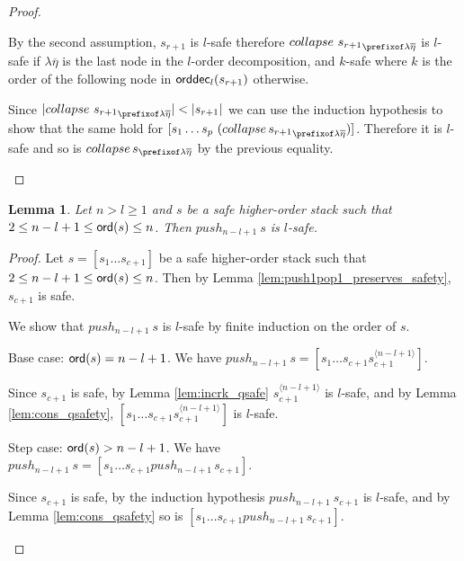 \documentclass[a4paper]{article}
\newtheorem{lemma}{Lemma}[section]
\theoremstyle{remark}
\theoremstyle{definition}
\newcommand\orddec{{\sf orddec}}
\begin{document}
\begin{proof}
\begin{enumerate}[(i)]
By the second assumption, $s_{r+1}$ is $l$-safe therefore $collapse~{s_{r+1}}_{\prefixof\lambda\overline\eta}$
is $l$-safe if $\lambda\overline\eta$ is the last node in the $l$-order decomposition,
and $k$-safe where $k$ is the order of the following node in $\orddec_l(s_{r+1})$ otherwise.

Since $|collapse~{s_{r+1}}_{\prefixof\lambda\overline\eta}| < |s_{r+1}|$ we can use the induction hypothesis 
to show that the same hold for $[s_1 \ldots s_p\ (collapse\, {s_{r+1}}_{\prefixof\lambda\overline\eta}) ]$. Therefore it is $l$-safe and so is
$collapse\,s_{\prefixof\lambda\overline\eta}$ by the previous equality.
\qedhere
\end{enumerate}
\end{proof}


\begin{lemma}
\label{lem:pushj_safe_implies_l-safe} Let $n>l\geq 1$ and $s$ be a safe higher-order stack such that $2 \leq n-l+1 \leq {\sf ord}(s) \leq n$. Then $push_{n-l+1}\ s$ is $l$-safe.
\end{lemma}
\begin{proof}
Let $s=[s_1 \ldots s_{c+1}]$ be a safe higher-order stack such that $2 \leq n-l+1 \leq {\sf ord}(s) \leq n$. Then by Lemma \ref{lem:push1pop1_preserves_safety}, $s_{c+1}$ is safe.

We show that $push_{n-l+1}~s$ is $l$-safe by finite induction on the order of $s$.
    \begin{compactitem}
      \item Base case: ${\sf ord}(s) = n-l+1 $. We have
    $push_{n-l+1}~s = [ s_1 \ldots s_{c+1} s_{c+1}^{\langle n-l+1
    \rangle}]$.

    Since $s_{c+1}$ is safe,  by Lemma \ref{lem:incrk_qsafe} $s_{c+1}^{\langle n-l+1\rangle}$ is $l$-safe, and by Lemma
    \ref{lem:cons_qsafety},  $[ s_1 \ldots s_{c+1} s_{c+1}^{\langle n-l+1
    \rangle}]$ is $l$-safe.

      \item Step case: ${\sf ord}(s) > n-l+1$. We have
    $push_{n-l+1}~s = [ s_1 \ldots s_{c+1} push_{n-l+1}\,s_{c+1}]$.

    Since $s_{c+1}$ is safe, by the
    induction hypothesis $push_{n-l+1}~s_{c+1}$ is $l$-safe, and by Lemma \ref{lem:cons_qsafety} so is $[ s_1 \ldots s_{c+1} push_{n-l+1}\,s_{c+1}]$.
\qedhere
    \end{compactitem}
\end{proof}
\end{document}
